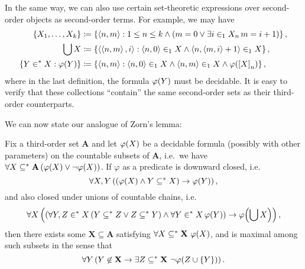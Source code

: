 \documentclass[11pt]{article}
\theoremstyle{plain}
\theoremstyle{definition}
\newcommand{\tuple}[1]{\left\langle #1 \right\rangle}
\begin{document}
In the same way, we can also use certain set-theoretic expressions over second-order objects as second-order terms. For example, we may have
\begin{align*}
    \left\{X_1, \ldots, X_k\right\}                    & \coloneqq \left\{\tuple{n, m} : 1 \leq n \leq k \land \left(m = 0 \lor \exists i \in_1 X_n \, m = i + 1\right)\right\},               \\
    \bigcup X                                          & \coloneqq \left\{\tuple{\tuple{n, m}, i} : \tuple{n, 0} \in_1 X \land \tuple{n, \tuple{m, i} + 1} \in_1 X\right\},                    \\
    \left\{Y \in^* X : \varphi\mleft(Y\mright)\right\} & \coloneqq \left\{\tuple{n, m} : \tuple{n, 0} \in_1 X \land \tuple{n, m} \in_1 X \land \varphi\mleft(\left[X\right]_n\mright)\right\},
\end{align*}
where in the last definition, the formula $\varphi\mleft(Y\mright)$ must be decidable. It is easy to verify that these collections ``contain'' the same second-order sets as their third-order counterparts.

We can now state our analogue of Zorn's lemma:

\begin{proposition}
    \label{prop:zorns-lemma}
    Fix a third-order set $\mathbf{A}$ and let $\varphi\mleft(X\mright)$ be a decidable formula (possibly with other parameters) on the countable subsets of $\mathbf{A}$, i.e.\ we have $\forall X \subseteq^* \mathbf{A} \left(\varphi\mleft(X\mright) \lor \neg \varphi\mleft(X\mright)\right)$. If $\varphi$ as a predicate is downward closed, i.e.
    \[\forall X, Y \left(\left(\varphi\mleft(X\mright) \land Y \subseteq^* X\right) \rightarrow \varphi\mleft(Y\mright)\right),\]
    and also closed under unions of countable chains, i.e.
    \[\forall X \left(\left(\forall Y, Z \in^* X \left(Y \subseteq^* Z \lor Z \subseteq^* Y\right) \land \forall Y \in^* X \, \varphi\mleft(Y\mright)\right) \rightarrow \varphi\mleft(\bigcup X\mright)\right),\]
    then there exists some $\mathbf{X} \subseteq \mathbf{A}$ satisfying $\forall X \subseteq^* \mathbf{X} \ \varphi\mleft(X\mright)$, and is maximal among such subsets in the sense that
    \[\forall Y \left(Y \not\in \mathbf{X} \rightarrow \exists Z \subseteq^* \mathbf{X} \ \neg \varphi\mleft(Z \cup \left\{Y\right\}\mright)\right).\]
\end{proposition}
\end{document}
